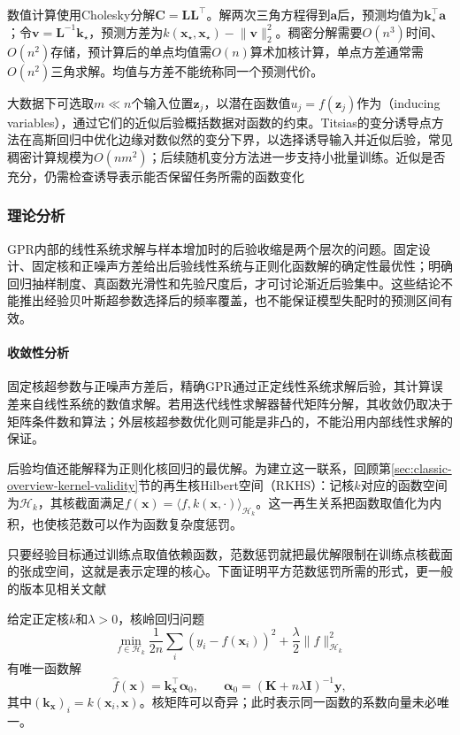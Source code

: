 数值计算使用Cholesky分解$\bm{C}=\bm{L}\bm{L}^{\top}$。解两次三角方程得到$\bm{a}$后，预测均值为$\bm{k}_{\star}^{\top}\bm{a}$；令$\bm{v}=\bm{L}^{-1}\bm{k}_{\star}$，预测方差为$k(\bm{x}_{\star},\bm{x}_{\star})-\lVert\bm{v}\rVert_2^2$。稠密分解需要$O(n^3)$时间、$O(n^2)$存储，预计算后的单点均值需$O(n)$算术加核计算，单点方差通常需$O(n^2)$三角求解。均值与方差不能统称同一个预测代价。

大数据下可选取$m\ll n$个输入位置$\bm{z}_j$，以潜在函数值$u_j=f(\bm{z}_j)$作为（inducing variables），通过它们的近似后验概括数据对函数的约束。Titsias的变分诱导点方法在高斯回归中优化边缘对数似然的变分下界，以选择诱导输入并近似后验，常见稠密计算规模为$O(nm^2)$；后续随机变分方法进一步支持小批量训练。近似是否充分，仍需检查诱导表示能否保留任务所需的函数变化

\subsubsection{理论分析}
\label{sec:regression-gpr-theory}

GPR内部的线性系统求解与样本增加时的后验收缩是两个层次的问题。固定设计、固定核和正噪声方差给出后验线性系统与正则化函数解的确定性最优性；明确回归抽样制度、真函数光滑性和先验尺度后，才可讨论渐近后验集中。这些结论不能推出经验贝叶斯超参数选择后的频率覆盖，也不能保证模型失配时的预测区间有效。

\paragraph{收敛性分析}
固定核超参数与正噪声方差后，精确GPR通过正定线性系统求解后验，其计算误差来自线性系统的数值求解。若用迭代线性求解器替代矩阵分解，其收敛仍取决于矩阵条件数和算法；外层核超参数优化则可能是非凸的，不能沿用内部线性求解的保证。

后验均值还能解释为正则化核回归的最优解。为建立这一联系，回顾第\ref{sec:classic-overview-kernel-validity}节的再生核Hilbert空间（RKHS）：记核$k$对应的函数空间为$\mathcal H_k$，其核截面满足$f(\bm{x})=\langle f,k(\bm{x},\cdot)\rangle_{\mathcal H_k}$。这一再生关系把函数取值化为内积，也使核范数可以作为函数复杂度惩罚。

只要经验目标通过训练点取值依赖函数，范数惩罚就把最优解限制在训练点核截面的张成空间，这就是表示定理的核心。下面证明平方范数惩罚所需的形式，更一般的版本见相关文献

\begin{theorem}[表示定理与核岭回归解]
  \label{thm:regression-krr}
  给定正定核$k$和$\lambda>0$，核岭回归问题
  \[
    \min_{f\in\mathcal H_k}
      \frac1{2n}\sum_i(y_i-f(\bm{x}_i))^2
       +\frac{\lambda}{2}\lVert f\rVert_{\mathcal H_k}^2
  \]
  有唯一函数解
  \[
    \widehat f(\bm{x})=\bm{k}_{\bm{x}}^{\top}\bm{\alpha}_0,\qquad
    \bm{\alpha}_0=(\bm{K}+n\lambda\bm{I})^{-1}\bm{y},
  \]
  其中$(\bm{k}_{\bm{x}})_i=k(\bm{x}_i,\bm{x})$。核矩阵可以奇异；此时表示同一函数的系数向量未必唯一。
\end{theorem}


